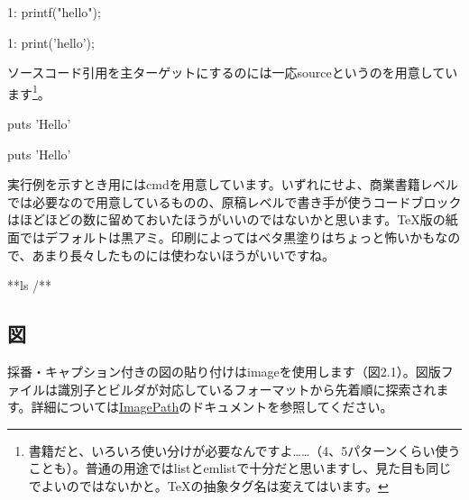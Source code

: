 \begin{reviewlistblock}
\begin{reviewemlist}
  1: printf("hello");
\end{reviewemlist}
\end{reviewlistblock}


\begin{reviewlistblock}
\begin{reviewemlist}
  1: print('hello');
\end{reviewemlist}
\end{reviewlistblock}

ソースコード引用を主ターゲットにするのには一応sourceというのを用意しています\footnote{書籍だと、いろいろ使い分けが必要なんですよ……（4、5パターンくらい使うことも）。普通の用途ではlistとemlistで十分だと思いますし、見た目も同じでよいのではないかと。TeXの抽象タグ名は変えてはいます。}。


\begin{reviewlistblock}
\begin{reviewemlist}
puts 'Hello'
\end{reviewemlist}
\end{reviewlistblock}

\begin{reviewlistblock}
\begin{reviewemlist}
puts 'Hello'
\end{reviewemlist}
\end{reviewlistblock}

実行例を示すとき用にはcmdを用意しています。いずれにせよ、商業書籍レベルでは必要なので用意しているものの、原稿レベルで書き手が使うコードブロックはほどほどの数に留めておいたほうがいいのではないかと思います。TeX版の紙面ではデフォルトは黒アミ。印刷によってはベタ黒塗りはちょっと怖いかもなので、あまり長々したものには使わないほうがいいですね。

\begin{reviewlistblock}
\begin{reviewemlist}
\textdollar{} **ls /**
\end{reviewemlist}
\end{reviewlistblock}

\subsection{図}
\label{sec:2-1-2}

採番・キャプション付きの図の貼り付けはimageを使用します（図2.1）。図版ファイルは識別子とビルダが対応しているフォーマットから先着順に探索されます。詳細については\href{https://github.com/kmuto/review/wiki/ImagePath}{ImagePath}のドキュメントを参照してください。

